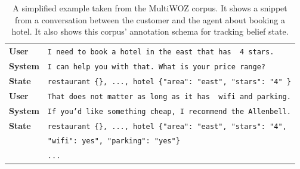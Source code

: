\begin{table}[tp]
    \centering
    \begin{tabular}{l|l}
    \toprule
         \textbf{User} & \texttt{I need to book a hotel in the {\color{cyan!80!yellow!80!black!100 }east} that has { \color{orange!50!yellow!90!black!100!}4 stars.}} \\
         \textbf{System} & \texttt{I can help you with that. What is your price range?} \\
         \textbf{State} & \texttt{restaurant \{\}, ..., hotel \{"area": "{\color{cyan!80!yellow!80!black!100 }east}", "stars": "{\color{orange!50!yellow!90!black!100!}4}" \}} \\
         \textbf{User} & \texttt{That does not matter as long as it has {\color{cyan!80!yellow!80!black!100 } wifi} and {\color{orange!50!yellow!90!black!100!}parking}.}\\
         \textbf{System} & \texttt{If you'd like something cheap, I recommend the Allenbell.} \\
         \textbf{State} & \texttt{restaurant \{\}, ..., hotel \{"area": "east", "stars": "4",}\\
         & \texttt{"wifi": {\color{cyan!80!yellow!80!black!100}yes}", "parking": "{\color{orange!50!yellow!90!black!100!}yes}"\}} \\
         & \texttt{...} \\
         \bottomrule
    \end{tabular}
    \caption{A simplified example taken from the MultiWOZ corpus. It shows a snippet from a conversation between the customer and the agent about booking a hotel. It also shows this corpus' annotation schema for tracking belief state.}
    \label{02:tab:mw_example}
\end{table}


